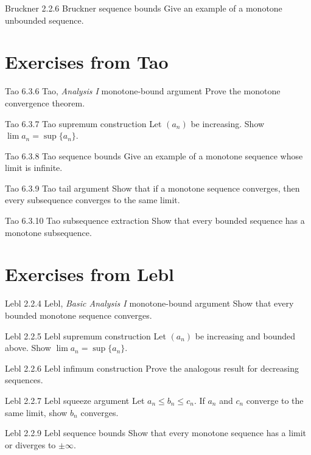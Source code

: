 \exstub
{Bruckner 2.2.6}
{Bruckner}
{sequence bounds}
{Give an example of a monotone unbounded sequence.}


\section*{Exercises from Tao}

\exstub
{Tao 6.3.6}
{Tao, \textit{Analysis I}}
{monotone-bound argument}
{Prove the monotone convergence theorem.}

\exstub
{Tao 6.3.7}
{Tao}
{supremum construction}
{Let $(a_n)$ be increasing.
Show $\lim a_n = \sup\{a_n\}$.}

\exstub
{Tao 6.3.8}
{Tao}
{sequence bounds}
{Give an example of a monotone sequence
whose limit is infinite.}

\exstub
{Tao 6.3.9}
{Tao}
{tail argument}
{Show that if a monotone sequence converges,
then every subsequence converges to the same limit.}

\exstub
{Tao 6.3.10}
{Tao}
{subsequence extraction}
{Show that every bounded sequence has
a monotone subsequence.}


\section*{Exercises from Lebl}

\exstub
{Lebl 2.2.4}
{Lebl, \textit{Basic Analysis I}}
{monotone-bound argument}
{Show that every bounded monotone sequence converges.}

\exstub
{Lebl 2.2.5}
{Lebl}
{supremum construction}
{Let $(a_n)$ be increasing and bounded above.
Show $\lim a_n = \sup\{a_n\}$.}

\exstub
{Lebl 2.2.6}
{Lebl}
{infimum construction}
{Prove the analogous result for decreasing sequences.}

\exstub
{Lebl 2.2.7}
{Lebl}
{squeeze argument}
{Let $a_n \le b_n \le c_n$.
If $a_n$ and $c_n$ converge to the same limit,
show $b_n$ converges.}

\exstub
{Lebl 2.2.9}
{Lebl}
{sequence bounds}
{Show that every monotone sequence has a limit
or diverges to $\pm\infty$.}


